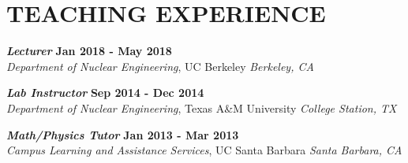 \section{\small{TEACHING EXPERIENCE}}

{\sl\bf Lecturer} \hfill {\bf Jan 2018 - May 2018} \\
{\sl Department of Nuclear Engineering}, UC Berkeley \hfill {\sl Berkeley, CA}\\[-2.8ex]
\vspace{-5pt}

{\sl\bf Lab Instructor} \hfill {\bf Sep 2014 - Dec 2014} \\
{\sl Department of Nuclear Engineering}, Texas A\&M University \hfill {\sl College Station, TX}\\[-2.8ex]
\vspace{-5pt}

{\sl\bf Math/Physics Tutor} \hfill {\bf Jan 2013 - Mar 2013} \\
{\sl Campus Learning and Assistance Services}, UC Santa Barbara \hfill {\sl Santa Barbara, CA}\\[-2.8ex]